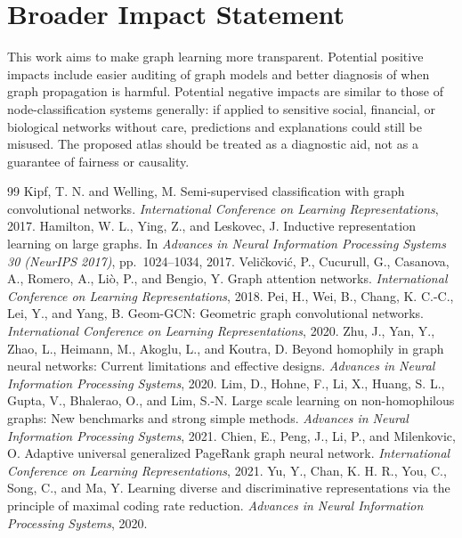 \documentclass{article}
\begin{document}
\section*{Broader Impact Statement}
This work aims to make graph learning more transparent.
Potential positive impacts include easier auditing of graph models and better diagnosis of when graph propagation is harmful. Potential negative impacts are similar to those of node-classification systems generally: if applied to sensitive social, financial, or biological networks without care, predictions and explanations could still be misused. The proposed atlas should be treated as a diagnostic aid, not as a guarantee of fairness or causality.

\begin{thebibliography}{99}
 Kipf, T. N. and Welling, M. Semi-supervised classification with graph convolutional networks. \emph{International Conference on Learning Representations}, 2017.
Hamilton, W. L., Ying, Z., and Leskovec, J. Inductive representation learning on
large graphs. In \emph{Advances in Neural Information Processing Systems 30
(NeurIPS 2017)}, pp.~1024--1034, 2017.
 Veličković, P., Cucurull, G., Casanova, A., Romero, A., Liò, P., and Bengio, Y. Graph attention networks. \emph{International Conference on Learning Representations}, 2018.
 Pei, H., Wei, B., Chang, K. C.-C., Lei, Y., and Yang, B. Geom-GCN: Geometric graph convolutional networks. \emph{International Conference on Learning Representations}, 2020.
 Zhu, J., Yan, Y., Zhao, L., Heimann, M., Akoglu, L., and Koutra, D. Beyond homophily in graph neural networks: Current limitations and effective designs. \emph{Advances in Neural Information Processing Systems}, 2020.
 Lim, D., Hohne, F., Li, X., Huang, S. L., Gupta, V., Bhalerao, O., and Lim, S.-N. Large scale learning on non-homophilous graphs: New benchmarks and strong simple methods. \emph{Advances in Neural Information Processing Systems}, 2021.
 Chien, E., Peng, J., Li, P., and Milenkovic, O. Adaptive universal generalized PageRank graph neural network. \emph{International Conference on Learning Representations}, 2021.
 Yu, Y., Chan, K. H. R., You, C., Song, C., and Ma, Y. Learning diverse and discriminative representations via the principle of maximal coding rate reduction. \emph{Advances in Neural Information Processing Systems}, 2020.

\end{thebibliography}
\end{document}
